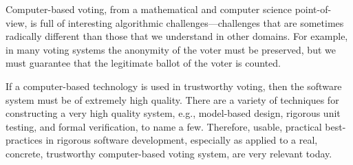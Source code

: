 \documentclass[letterpaper,twocolumn,10pt]{article}
\begin{document}
Computer-based voting, from a mathematical and computer science
point-of-view, is full of interesting algorithmic
challenges---challenges that are sometimes radically different than
those that we understand in other domains.  For example, in
many voting systems the anonymity of the voter must be preserved, but
we must guarantee that the legitimate ballot of the voter is counted.

If a computer-based technology is used in trustworthy voting, then the
software system must be of extremely high quality.  There are a
variety of techniques for constructing a very high quality system,
e.g., model-based design, rigorous unit testing, and formal
verification, to name a few.  Therefore, usable, practical
best-practices in rigorous software development, especially as applied
to a real, concrete, trustworthy computer-based voting system, are
very relevant today.
\end{document}
